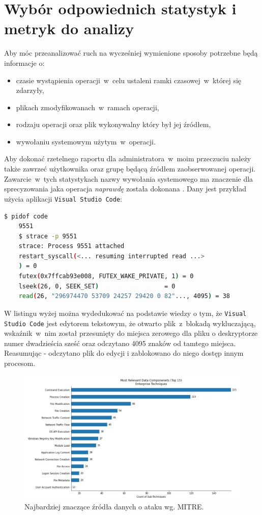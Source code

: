 \section{Wybór odpowiednich statystyk i metryk do analizy}
\label{sec:wybor}
Aby móc przeanalizować ruch na wycześniej wymienione sposoby potrzebne będą informacje o:
\begin{itemize}
    \item czasie wystąpienia operacji~w~celu ustaleni ramki czasowej~w~której się zdarzyły,
    \item plikach zmodyfikowanach~w~ramach operacji,
    \item rodzaju operacji oraz plik wykonywalny który był jej źródłem,
    \item wywołaniu systemowym użytym~w~operacji.
\end{itemize}
Aby dokonać rzetelnego raportu dla administratora~w~moim przeczuciu należy także zawrzeć użytkownika oraz grupę będącą źródłem zaobserwowanej operacji. 
Zawarcie~w~tych statystykach nazwy wywołania systemowego ma znaczenie dla sprecyzowania jaka operacja \emph{naprawdę} została dokonana \cite{kernel}. Dany jest przykład użycia aplikacji \texttt{Visual Studio Code}: 
\begin{lstlisting}[language=bash,
    backgroundcolor=\color{EEGold!5!white},
    caption={Przykładowo używając \texttt{Visual Studio Code} niektóre operacje mogą
    sprawiać pozory, że na pliku wywołano polecenie \texttt{code} bez wiedzy co dokładnie zaszło podczas działania programu.},
    label={lst:helloC}]
    $ pidof code
    9551
    $ strace -p 9551
    strace: Process 9551 attached
    restart_syscall(<... resuming interrupted read ...>
    ) = 0
    futex(0x7ffcab93e008, FUTEX_WAKE_PRIVATE, 1) = 0
    lseek(26, 0, SEEK_SET)                  = 0
    read(26, "296974470 53709 24257 29420 0 82"..., 4095) = 38
\end{lstlisting}
W listingu wyżej można wydedukować na podstawie wiedzy o tym, że \texttt{Visual Studio Code} jest edytorem tekstowym, że otwarto plik~z~blokadą wykluczającą, wskaźnik~w~nim został przesunięty do miejsca zerowego dla pliku o deskryptorze numer dwadzieścia sześć oraz odczytano 4095 znaków od tamtego miejsca. Reasumując - odczytano plik do edycji i zablokowano do niego dostęp innym procesom.
\begin{figure}[H]
    \centering
    \includegraphics[width=0.5\linewidth]{rysunki/relevant_data_components.jpg}
    \caption{Najbardziej znaczące źródła danych o ataku wg. MITRE\protect\footnotemark .}
    \label{fig:enter-label}
\end{figure}
